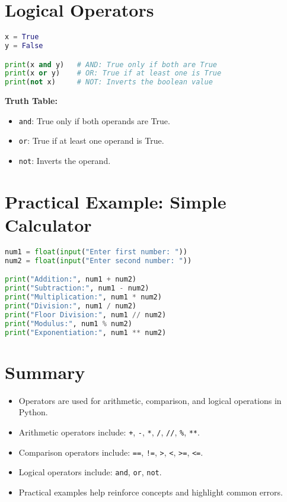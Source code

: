 \section{Logical Operators}

\begin{lstlisting}[language=Python]
x = True
y = False

print(x and y)   # AND: True only if both are True
print(x or y)    # OR: True if at least one is True
print(not x)     # NOT: Inverts the boolean value
\end{lstlisting}

\textbf{Truth Table:}
\begin{itemize}
    \item \texttt{and}: True only if both operands are True.
    \item \texttt{or}: True if at least one operand is True.
    \item \texttt{not}: Inverts the operand.
\end{itemize}

\section{Practical Example: Simple Calculator}

\begin{lstlisting}[language=Python]
num1 = float(input("Enter first number: "))
num2 = float(input("Enter second number: "))

print("Addition:", num1 + num2)
print("Subtraction:", num1 - num2)
print("Multiplication:", num1 * num2)
print("Division:", num1 / num2)
print("Floor Division:", num1 // num2)
print("Modulus:", num1 % num2)
print("Exponentiation:", num1 ** num2)
\end{lstlisting}

\section{Summary}

\begin{itemize}
    \item Operators are used for arithmetic, comparison, and logical operations in Python.
    \item Arithmetic operators include: \texttt{+}, \texttt{-}, \texttt{*}, \texttt{/}, \texttt{//}, \texttt{\%}, \texttt{**}.
    \item Comparison operators include: \texttt{==}, \texttt{!=}, \texttt{>}, \texttt{<}, \texttt{>=}, \texttt{<=}.
    \item Logical operators include: \texttt{and}, \texttt{or}, \texttt{not}.
    \item Practical examples help reinforce concepts and highlight common errors.
\end{itemize}

